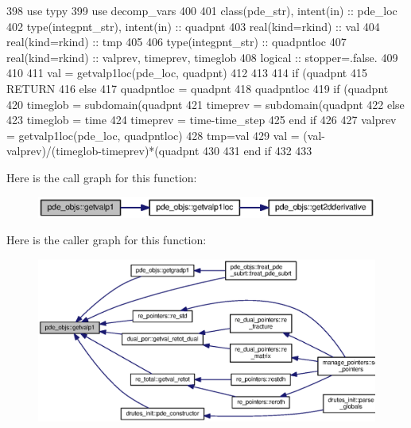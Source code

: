 \begin{DoxyCode}
398       \textcolor{keywordtype}{use }typy
399       \textcolor{keywordtype}{use }decomp_vars
400       
401       \textcolor{keywordtype}{class}(pde_str), \textcolor{keywordtype}{intent(in)} :: pde\_loc
402       \textcolor{keywordtype}{type}(integpnt_str), \textcolor{keywordtype}{intent(in)} :: quadpnt
403       \textcolor{keywordtype}{real(kind=rkind)} :: val
404       \textcolor{keywordtype}{real(kind=rkind)} :: tmp
405       
406       \textcolor{keywordtype}{type}(integpnt_str) :: quadpntloc
407       \textcolor{keywordtype}{real(kind=rkind)} :: valprev, timeprev, timeglob
408       \textcolor{keywordtype}{logical} :: stopper=.false.
409 
410    
411        val = getvalp1loc(pde\_loc, quadpnt)
412 
413 
414       \textcolor{keywordflow}{if} (quadpnt%
415         \textcolor{keywordflow}{RETURN}
416       \textcolor{keywordflow}{else}
417         quadpntloc = quadpnt
418         quadpntloc%
419         \textcolor{keywordflow}{if} (quadpnt%
420           timeglob = subdomain(quadpnt%
421           timeprev = subdomain(quadpnt%
422         \textcolor{keywordflow}{else}
423           timeglob = time
424           timeprev = time-time_step
425 \textcolor{keywordflow}{        end if}
426 
427         valprev = getvalp1loc(pde\_loc, quadpntloc)
428         tmp=val
429         val = (val-valprev)/(timeglob-timeprev)*(quadpnt%
430 
431 \textcolor{keywordflow}{      end if}
432         
433     
\end{DoxyCode}


Here is the call graph for this function\+:\nopagebreak
\begin{figure}[H]
\begin{center}
\leavevmode
\includegraphics[width=350pt]{namespacepde__objs_aece3def127980c03c455456068cb3e48_cgraph}
\end{center}
\end{figure}




Here is the caller graph for this function\+:\nopagebreak
\begin{figure}[H]
\begin{center}
\leavevmode
\includegraphics[width=350pt]{namespacepde__objs_aece3def127980c03c455456068cb3e48_icgraph}
\end{center}
\end{figure}


